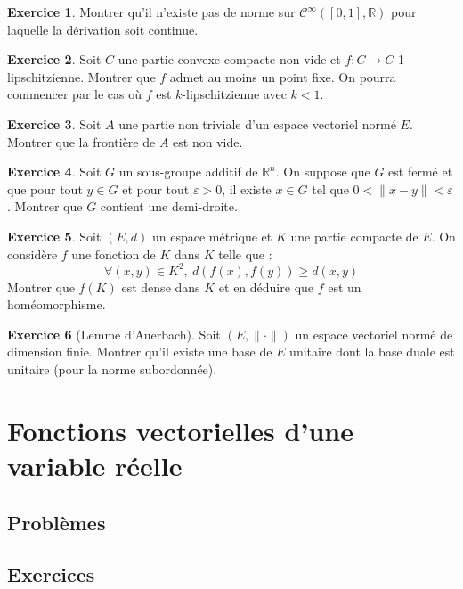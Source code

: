\documentclass[french]{book}
\newcommand{\R}{\mathbb{R}}
\theoremstyle{definition}
\newtheorem{ex}{Exercice}[chapter]
\theoremstyle{remark}
\begin{document}
\begin{ex}
	Montrer qu'il n'existe pas de norme sur $\mathcal{C}^{\infty}([0,1],\R)$ pour laquelle la dérivation soit continue.
\end{ex}

\begin{ex}
	Soit $C$ une partie convexe compacte non vide et $f:C\to C$ 1-lipschitzienne. Montrer que $f$ admet au moins un point fixe. On pourra commencer par le cas où $f$ est $k$-lipschitzienne avec $k<1$.
\end{ex}

\begin{ex}
	Soit $A$ une partie non triviale d'un espace vectoriel normé $E$. Montrer que la frontière de $A$ est non vide.
\end{ex}

\begin{ex}
	Soit $G$ un sous-groupe additif de $\R^n$. On suppose que $G$ est fermé et que pour tout $y\in G$ et pour tout $\varepsilon>0$, il existe $x\in G$ tel que $0<\lVert x-y\rVert<\varepsilon$. Montrer que $G$ contient une demi-droite.
\end{ex}

\begin{ex}
	Soit $(E,d)$ un espace métrique et $K$ une partie compacte de $E$. On considère $f$ une fonction de $K$ dans $K$ telle que : $$\forall (x,y)\in K^2,\ d(f(x),f(y))\geqslant d(x,y)$$
	Montrer que $f(K)$ est dense dans $K$ et en déduire que $f$ est un homéomorphisme.
\end{ex}

\begin{ex}[Lemme d'Auerbach]
	Soit $(E,\lVert\cdot\rVert)$ un espace vectoriel normé de dimension finie. Montrer qu'il existe une base de $E$ unitaire dont la base duale est unitaire (pour la norme subordonnée).
\end{ex}

\chapter{Fonctions vectorielles d'une variable réelle}

\section{Problèmes}

\section{Exercices}
\end{document}
